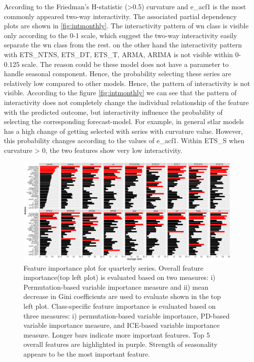 \documentclass[11pt,a4paper,]{article}
\begin{document}
According to the Friedman's H-statistic (\textgreater{}0.5) curvature and e\_acf1 is the most commonly appeared two-way interactivity. The associated partial dependency plots are shown in \autoref{fig:intmonthly}. The interactivity pattern of wn class is visible only according to the 0-1 scale, which suggest the two-way interactivity easily separate the wn class from the rest. on the other hand the interactivity pattern with ETS\_NTNS, ETS\_DT, ETS\_T, ARMA, ARIMA is not visible within 0-0.125 scale. The reason could be these model does not have a parameter to handle seasonal component. Hence, the probability selecting these series are relatively low compared to other models. Hence, the pattern of interactivity is not visible. According to the figure \autoref{fig:intmonthly} we can see that the pattern of interactivity does not completely change the individual relationship of the feature with the predicted outcome, but interactivity influence the probability of selecting the corresponding forecast-model. For example, in general stlar models has a high change of getting selected with series with curvature value. However, this probability changes according to the values of e\_acf1. Within ETS\_S when curvature \textgreater{} 0, the two features show very low interactivity.

\begin{figure}
\centering
\includegraphics{figures/viquarterly-1.pdf}
\caption{\label{fig:viquarterly}Feature importance plot for quarterly series. Overall feature importance(top left plot) is evaluated based on two measures: i) Permutation-based variable importance measure and ii) mean decrease in Gini coefficients are used to evaluate shown in the top left plot. Class-specific feature importance is evaluated based on three measures: i) permutation-based variable importance, PD-based variable importance measure, and ICE-based variable importance measure. Longer bars indicate more important features. Top 5 overall features are highlighted in purple. Strength of seasonality appears to be the most important feature.}
\end{figure}
\end{document}
